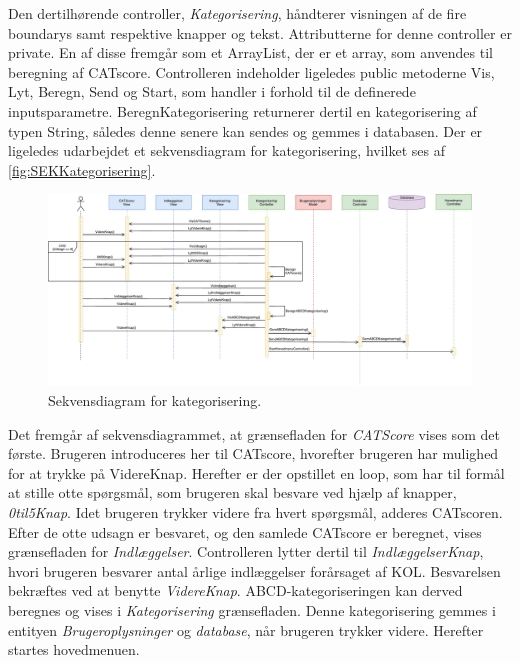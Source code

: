 Den dertilhørende controller, \textit{Kategorisering}, håndterer visningen af de fire boundarys samt respektive knapper og tekst. Attributterne for denne controller er private. En af disse fremgår som et ArrayList, der er et array, som anvendes til beregning af CATscore. Controlleren indeholder ligeledes public metoderne Vis, Lyt, Beregn, Send og Start, som handler i forhold til de definerede inputsparametre. BeregnKategorisering returnerer dertil en kategorisering af typen String, således denne senere kan sendes og gemmes i databasen. Der er ligeledes udarbejdet et sekvensdiagram for kategorisering, hvilket ses af \autoref{fig:SEKKategorisering}.

\begin{figure} [H]
\centering
\includegraphics[width=1.55\textwidth, angle=90]{figures/Sek/SEKKategorisering}
\caption{Sekvensdiagram for kategorisering.}
\label{fig:SEKKategorisering}
\end{figure}

\noindent
Det fremgår af sekvensdiagrammet, at grænsefladen for \textit{CATScore} vises som det første. Brugeren introduceres her til CATscore, hvorefter brugeren har mulighed for at trykke på VidereKnap. Herefter er der opstillet en loop, som har til formål at stille otte spørgsmål, som brugeren skal besvare ved hjælp af knapper, \textit{0til5Knap}. Idet brugeren trykker videre fra hvert spørgsmål, adderes CATscoren. Efter de otte udsagn er besvaret, og den samlede CATscore er beregnet, vises grænsefladen for \textit{Indlæggelser}. Controlleren lytter dertil til \textit{IndlæggelserKnap}, hvori brugeren besvarer antal årlige indlæggelser forårsaget af KOL. Besvarelsen bekræftes ved at benytte \textit{VidereKnap}. ABCD-kategoriseringen kan derved beregnes og vises i \textit{Kategorisering} grænsefladen. Denne kategorisering gemmes i entityen \textit{Brugeroplysninger} og \textit{database}, når brugeren trykker videre. Herefter startes hovedmenuen.
